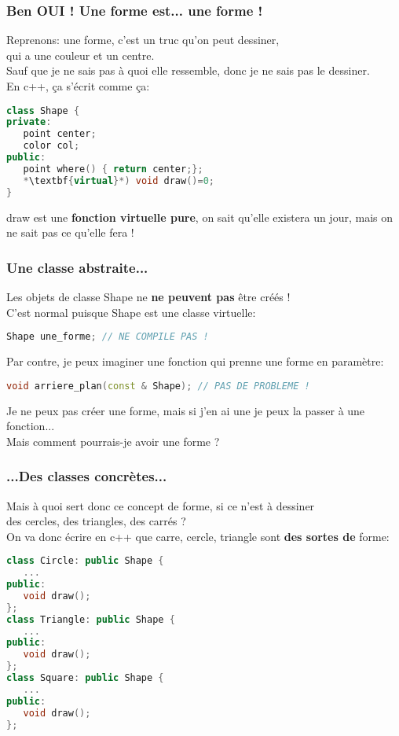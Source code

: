 \documentclass{beamer}
\begin{document}
\begin{frame}[fragile=singleslide,shrink=20]
\frametitle{Ben OUI ! Une forme est... une forme !}
Reprenons: une forme, c'est un truc qu'on peut dessiner, \\ qui a une couleur et un centre. \\
Sauf que je ne sais pas à quoi elle ressemble, donc je ne sais pas le dessiner. \\
En c++, ça s'écrit comme ça:

\begin{lstlisting}[language=c++]
class Shape {
private:
   point center;
   color col;
public:
   point where() { return center;};
   *\textbf{virtual}*) void draw()=0;
}
\end{lstlisting}
draw est une \textbf{fonction virtuelle pure}, on sait qu'elle existera un jour, mais on ne sait pas ce qu'elle fera !
\end{frame}

\begin{frame}[fragile=singleslide,shrink=20]
\frametitle{Une classe abstraite...}
Les objets de classe Shape ne \textbf{ne peuvent pas} être créés ! \\
C'est normal puisque Shape est une classe virtuelle: 
\begin{lstlisting}[language=c++]
Shape une_forme; // NE COMPILE PAS !
\end{lstlisting}

Par contre, je peux imaginer une fonction qui prenne une forme en paramètre:
\begin{lstlisting}[language=c++]
void arriere_plan(const & Shape); // PAS DE PROBLEME !
\end{lstlisting}
Je ne peux pas créer une forme, mais si j'en ai une je peux la passer à une fonction... \\
Mais comment pourrais-je avoir une forme ?
\end{frame}

\begin{frame}[fragile=singleslide,shrink=20]
\frametitle{...Des classes concrètes...}
Mais à quoi sert donc ce concept de forme, si ce n'est à dessiner \\ 
des cercles, des triangles, des carrés ? \\
On va donc écrire en c++ que carre, cercle, triangle sont \textbf{des sortes de} forme:

\begin{lstlisting}[language=c++]
class Circle: public Shape {
   ...
public:
   void draw();
};
class Triangle: public Shape {
   ...
public:
   void draw();
};
class Square: public Shape {
   ...
public:
   void draw();
};
\end{lstlisting}
\end{frame}
\end{document}
